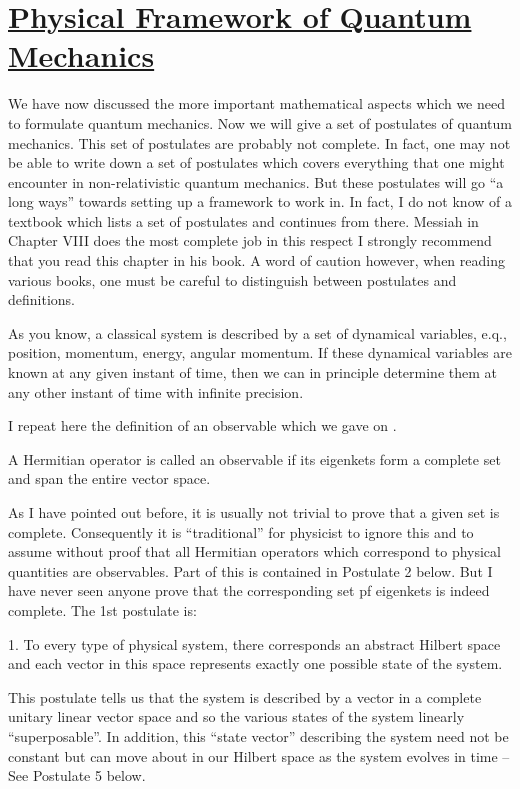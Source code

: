 \section{\underline{Physical Framework of Quantum Mechanics}}

We have now discussed the more important mathematical aspects which we need to formulate quantum mechanics. Now we will give a set of postulates of quantum mechanics. This set of postulates are probably not complete. 
In fact, one may not be able to write down a set of postulates which covers everything that one might encounter in non-relativistic quantum mechanics. But these postulates will go ``a long ways'' towards setting up a framework
to work in. In fact, I do not know of a textbook which lists a set of postulates and continues from there. Messiah in Chapter VIII does the most complete job in this respect I strongly recommend that you read this chapter in his book. 
A word of caution however, when reading various books, one must be careful to distinguish between postulates and definitions. 

As you know, a classical system is described by a set of dynamical variables, e.q., position, momentum, energy, angular momentum. If these dynamical variables are known at any given instant
of time, then we can in principle determine them at any other instant of time with infinite precision. 

I repeat here the definition of an observable which we gave on . 
\begin{definition} A Hermitian operator is called an observable if its eigenkets form a complete set and span the entire vector space.
\end{definition}

As I have pointed out before, it is usually not trivial to prove that a given set is complete. Consequently it is ``traditional'' for physicist to ignore this and to assume without proof that all Hermitian operators which
correspond to physical quantities are observables. Part of this is contained in Postulate 2 below. But I have never seen anyone prove that the corresponding set pf eigenkets is indeed complete.
The 1st postulate is: 
\begin{postulate}1. To every type of physical system, there corresponds an abstract Hilbert space and each vector in this space represents exactly one possible state of the system.
\end{postulate} 
This postulate tells us that the system is described by a vector in a complete unitary linear vector space and so the various states of the system linearly ``superposable''. In addition, this ``state vector'' describing the system 
need not be constant but can move about in our Hilbert space as the system evolves in time -- See Postulate 5 below. 

